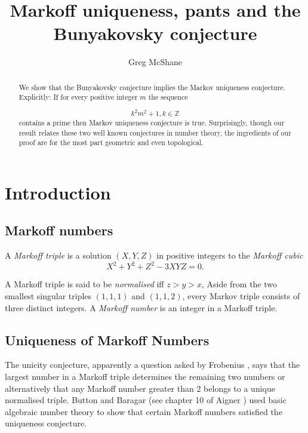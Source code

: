 \documentclass[12pt,a4paper]{amsart}
\title{Markoff uniqueness, pants and the Bunyakovsky conjecture}
\author[McShane]{Greg McShane}
\def\ZZ{\mathbb{Z}}
\begin{document}
\maketitle

\begin{abstract} 

We show that the Bunyakovsky conjecture implies the Markov uniqueness
conjecture. Explicitly: If for every positive integer $m$ the sequence 

$$k^2m^2 + 1, k \in \ZZ$$ 
\noindent
contains a prime then Markov uniqueness conjecture is true. Surprisingly,
though our result relates these two well known conjectures in number theory, 
the ingredients of  our proof are for the most part geometric and even
topological.

\end{abstract} 

\section{Introduction}

\subsection{Markoff numbers}

A \textit{Markoff triple} is a  solution $(X,Y,Z)$  in positive integers to
the \textit{Markoff cubic}
\begin{equation}\label{m cubic}
X^2 + Y^2 + Z^2 - 3XYZ = 0.
\end{equation}

A Markoff triple is said to be \textit{normalised} iff $z> y > x$, Aside from
the two smallest singular triples $(1,1,1)$ and $(1,1,2)$, every Markov triple
consists of three distinct integers. A \textit{Markoff number} is an integer in
a Markoff triple.

\subsection{Uniqueness of Markoff Numbers}
 
The unicity conjecture, apparently a question asked by Frobenius \cite{frobenius}, says that the
largest number in a Markoff triple determines the remaining two numbers or
alternatively that any Markoff number greater than 2 belongs to a unique
normalised triple. Button and Baragar (see chapter 10 of Aigner \cite{aigner})
used  basic algebraic number theory to show that certain Markoff numbers
satisfied the uniqueness conjecture.  
\end{document}
